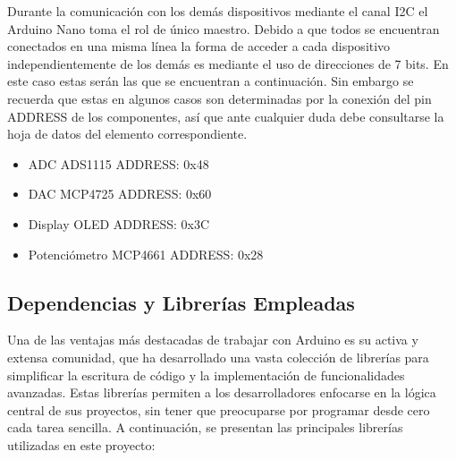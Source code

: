 Durante la comunicación con los demás dispositivos mediante el canal I2C el Arduino Nano toma el rol de único maestro. Debido a que todos se encuentran conectados en una misma línea la forma de acceder a cada dispositivo independientemente de los demás es mediante el uso de direcciones de 7 bits. En este caso estas serán las que se encuentran a continuación. Sin embargo se recuerda que estas en algunos casos son determinadas por la conexión del pin ADDRESS de los componentes, así que ante cualquier duda debe consultarse la hoja de datos del elemento correspondiente.
\begin{itemize}
    \item ADC ADS1115 ADDRESS: 0x48
    \item DAC MCP4725 ADDRESS: 0x60
    \item Display OLED ADDRESS: 0x3C
    \item Potenciómetro MCP4661 ADDRESS: 0x28
\end{itemize}

\subsection{Dependencias y Librerías Empleadas}

Una de las ventajas más destacadas de trabajar con Arduino es su activa y extensa comunidad, que ha desarrollado una vasta colección de librerías para simplificar la escritura de código y la implementación de funcionalidades avanzadas. Estas librerías permiten a los desarrolladores enfocarse en la lógica central de sus proyectos, sin tener que preocuparse por programar desde cero cada tarea sencilla. A continuación, se presentan las principales librerías utilizadas en este proyecto:

